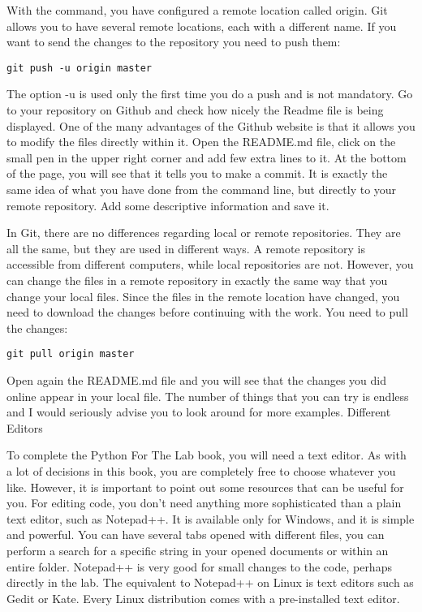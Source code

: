 With the command, you have configured a remote location called origin. Git allows you to have several remote locations, each with a different name. If you want to send the changes to the repository you need to push them:
\begin{verbatim}
git push -u origin master 
\end{verbatim}
The option -u is used only the first time you do a push and is not mandatory. Go to your repository on Github and check how nicely the Readme file is being displayed. One of the many advantages of the Github website is that it allows you to modify the files directly within it. Open the README.md file, click on the small pen in the upper right corner and add few extra lines to it. At the bottom of the page, you will see that it tells you to make a commit. It is exactly the same idea of what you have done from the command line, but directly to your remote repository. Add some descriptive information and save it.

In Git, there are no differences regarding local or remote repositories. They are all the same, but they are used in different ways. A remote repository is accessible from different computers, while local repositories are not. However, you can change the files in a remote repository in exactly the same way that you change your local files. Since the files in the remote location have changed, you need to download the changes before continuing with the work. You need to pull the changes:

\begin{verbatim}
git pull origin master
\end{verbatim}

Open again the README.md file and you will see that the changes you did online appear in your local file. The number of things that you can try is endless and I would seriously advise you to look around for more examples.
Different Editors

To complete the Python For The Lab book, you will need a text editor. As with a lot of decisions in this book, you are completely free to choose whatever you like. However, it is important to point out some resources that can be useful for you. For editing code, you don’t need anything more sophisticated than a plain text editor, such as Notepad++. It is available only for Windows, and it is simple and powerful. You can have several tabs opened with different files, you can perform a search for a specific string in your opened documents or within an entire folder. Notepad++ is very good for small changes to the code, perhaps directly in the lab. The equivalent to Notepad++ on Linux is text editors such as Gedit or Kate. Every Linux distribution comes with a pre-installed text editor.

